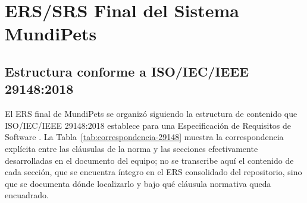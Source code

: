\documentclass[journal,onecolumn]{IEEEtran}
\begin{document}
\section{ERS/SRS Final del Sistema MundiPets}
\label{sec:ers-final}

\subsection{Estructura conforme a ISO/IEC/IEEE 29148:2018}
\label{sec:estructura-29148}

El ERS final de MundiPets se organizó siguiendo la estructura de contenido que
ISO/IEC/IEEE 29148:2018 establece para una Especificación de Requisitos de
Software \cite{ieee29148}. La Tabla~\ref{tab:correspondencia-29148} muestra la
correspondencia explícita entre las cláusulas de la norma y las secciones
efectivamente desarrolladas en el documento del equipo; no se transcribe aquí
el contenido de cada sección, que se encuentra íntegro en el ERS consolidado
del repositorio, sino que se documenta dónde localizarlo y bajo qué cláusula
normativa queda encuadrado.
\end{document}
